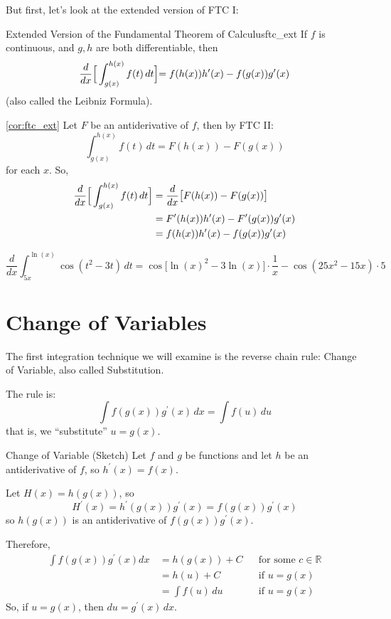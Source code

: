 But first, let's look at the extended version of FTC I\@:

\begin{Corollary}{Extended Version of the Fundamental Theorem of Calculus}{ftc_ext}
    If $ f $ is continuous, and $ g, h $ are both differentiable, then
    \[ \frac{d}{dx}\Bigr[\int_{g(x)}^{h(x)} f(t)\, d{t} \Bigl]
        =f(h(x))h^\prime(x)-f(g(x))g^\prime(x) \]
    (also called the Leibniz Formula).
\end{Corollary}

\begin{Proof}{\ref{cor:ftc_ext}}{}
    Let $ F $ be an antiderivative of $ f $, then by FTC II\@:
    \[ \int_{g(x)}^{h(x)} f(t)\, d{t}=F(h(x))-F(g(x)) \]
    for each $ x $. So,
    \begin{align*}
        \frac{d}{dx}\Bigr[\int_{g(x)}^{h(x)} f(t)\, d{t} \Bigl]
         & =\frac{d}{dx}\bigl[F(h(x))-F(g(x))\bigr]             \\
         & =F^\prime(h(x))h^\prime(x)-F^\prime(g(x))g^\prime(x) \\
         & =f(h(x))h^\prime(x)-f(g(x))g^\prime(x)
    \end{align*}
\end{Proof}

\begin{Example}{}{}
    \[ \frac{d}{dx}\int_{5x}^{\ln(x)} \cos(t^2-3t)\, d{t}
        =\cos\bigl[\ln(x)^2-3\ln(x)\bigr]\cdot\frac{1}{x}-\cos(25x^2-15x)\cdot 5 \]
\end{Example}

\section{Change of Variables}
The first integration technique we will examine is the reverse chain rule:
Change of Variable, also called Substitution.

The rule is:
\[ \int f(g(x))g^\prime(x)\, d{x}=\int f(u)\, d{u}  \]
that is, we ``substitute'' $ u=g(x) $.

\begin{Proof}{Change of Variable (Sketch)}
    Let $ f $ and $ g $ be functions and let $ h $ be an antiderivative of $ f $,
    so $ h^\prime(x)=f(x) $.

    Let $ H(x)=h(g(x)) $, so
    \[ H^\prime(x)=h^\prime(g(x))g^\prime(x)=f(g(x))g^\prime(x) \]
    so $ h(g(x)) $ is an antiderivative of $ f(g(x))g^\prime(x) $.

    Therefore,
    \begin{align*}
        \int f(g(x))g^\prime(x)d{x}\,
         & =h(g(x))+C        &  & \text{for some }c\in\mathbb{R} \\
         & =h(u)+C           &  & \text{if }u=g(x)               \\
         & =\int f(u)\, d{u} &  & \text{if }u=g(x)
    \end{align*}
    So, if $ u=g(x) $, then $ du=g^\prime(x)\,dx $.
\end{Proof}

